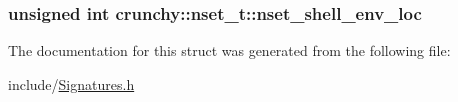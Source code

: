 \subsubsection[{nset\+\_\+shell\+\_\+env\+\_\+loc}]{\setlength{\rightskip}{0pt plus 5cm}unsigned int crunchy\+::nset\+\_\+t\+::nset\+\_\+shell\+\_\+env\+\_\+loc}\label{structcrunchy_1_1nset__t_ad915c66f77d295650d514a6804a662d2}


The documentation for this struct was generated from the following file\+:\begin{DoxyCompactItemize}
\item 
include/\hyperlink{_signatures_8h}{Signatures.\+h}\end{DoxyCompactItemize}
